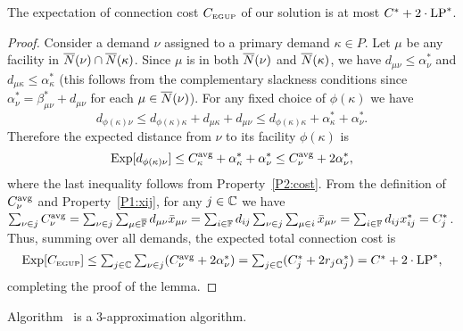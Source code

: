 \documentclass[11pt]{article}
\begin{document}

\begin{lemma}\label{lemma:3dist}
The expectation of connection cost $C_{\mbox{\tiny\rm EGUP}}$ of our solution
is at most  $C^\ast+2\cdot\mbox{\rm LP}^\ast$.
\end{lemma}

\begin{proof}
  Consider a demand $\nu$ assigned to a primary demand
  $\kappa\in P$. Let $\mu$ be any facility in ${\overline{N}}(\nu)
  \cap {\overline{N}}(\kappa)$.  Since $\mu$ is in both
  ${\overline{N}}(\nu)$ and ${\overline{N}}(\kappa)$, we have $d_{\mu\nu}
  \leq \alpha_{\nu}^\ast$ and $d_{\mu\kappa} \leq
  \alpha_{\kappa}^\ast$ (this follows from the complementary
  slackness conditions since
  $\alpha_{\nu}^\ast=\beta_{\mu\nu}^\ast + d_{\mu\nu}$ for
  each $\mu\in {\overline{N}}(\nu)$). For any fixed choice of
  $\phi(\kappa)$ we have
%
\begin{equation}
    d_{\phi(\kappa)\nu} \leq d_{\phi(\kappa)\kappa}+d_{\mu\kappa}+d_{\mu\nu}
    \leq d_{\phi(\kappa)\kappa} + \alpha_{\kappa}^\ast + \alpha_{\nu}^\ast.
\end{equation}
%
Therefore the expected distance from $\nu$ to its facility $\phi(\kappa)$ is 
%
\begin{equation}
  \mbox{\rm Exp}[  d_{\phi(\kappa)\nu}   ] \le C^{{\mbox{\scriptsize\rm avg}}}_{\kappa} + \alpha_{\kappa}^\ast + \alpha_{\nu}^\ast 
  \leq C^{{\mbox{\scriptsize\rm avg}}}_{\nu} + 2\alpha_{\nu}^\ast,
  \end{equation}
%
  where the last inequality follows from Property~\ref{P2:cost}.  
From the definition of $C^{{\mbox{\scriptsize\rm avg}}}_{\nu}$ and Property~\ref{P1:xij}, for any $j\in \mathbb{C}$ 
we have
$\sum_{\nu\in j} C^{{\mbox{\scriptsize\rm avg}}}_{\nu} = \sum_{\nu\in j}\sum_{\mu\in\overline{\mathbb{F}}}d_{\mu\nu}{\bar x}_{\mu\nu}
 			= \sum_{i\in\mathbb{F}} d_{ij}\sum_{\nu\in j}\sum_{\mu\in i}{\bar x}_{\mu\nu}
			= \sum_{i\in\mathbb{F}} d_{ij}x^\ast_{ij} 
			= C^\ast_j$. 
Thus, summing over all demands, the expected total connection cost is
%
\begin{equation}
    \mbox{\rm Exp}[C_{\mbox{\tiny\rm EGUP}}] \le 
			\textstyle{\sum_{j\in\mathbb{C}} \sum_{\nu\in j}} (C^{{\mbox{\scriptsize\rm avg}}}_{\nu} + 2\alpha_{\nu}^\ast) 
    	= \textstyle{\sum_{j\in\mathbb{C}}} (C_j^\ast + 2r_j\alpha_j^\ast)
 		= C^\ast + 2\cdot\mbox{\rm LP}^\ast,
\end{equation}
%
completing the proof of the lemma.
\end{proof}


\begin{theorem}
Algorithm~{\EGUP} is a $3$-approximation algorithm.
\end{theorem}
\end{document}
